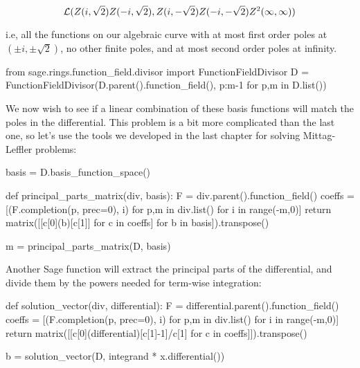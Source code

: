 $${\cal L}(Z(i, \sqrt{2}) Z(-i, \sqrt{2}), Z(i, -\sqrt{2}) Z(-i, -\sqrt{2}) Z^2(\infty,\infty))$$

i.e, all the functions on our algebraic curve with at most first order
poles at $(\pm i,\pm\sqrt{2})$, no other finite poles, and at most
second order poles at infinity.

\begin{sageblock}[riemannroch3]
from sage.rings.function_field.divisor import FunctionFieldDivisor
D = FunctionFieldDivisor(D.parent().function_field(), {p:m-1 for p,m in D.list()})
\end{sageblock}

We now wish to see if a linear combination of these basis functions will
match the poles in the differential.  This problem is a bit more complicated
than the last one, so let's use the tools we developed in the
last chapter for solving Mittag-Leffler problems:

\begin{sageblock}[riemannroch3]
basis = D.basis_function_space()
\end{sageblock}

\begin{sageblock}[riemannroch3]
def principal_parts_matrix(div, basis):
    F = div.parent().function_field()
    coeffs = [(F.completion(p, prec=0), i) for p,m in div.list() for i in range(-m,0)]
    return matrix([[c[0](b)[c[1]] for c in coeffs] for b in basis]).transpose()
\end{sageblock}

\begin{sageblock}[riemannroch3]
m = principal_parts_matrix(D, basis)
\end{sageblock}

Another Sage function will extract the principal parts of the
differential, and divide them by the powers needed for term-wise
integration:

\begin{sageblock}[riemannroch3]
def solution_vector(div, differential):
    F = differential.parent().function_field()
    coeffs = [(F.completion(p, prec=0), i) for p,m in div.list() for i in range(-m,0)]
    return matrix([[c[0](differential)[c[1]-1]/c[1] for c in coeffs]]).transpose()
\end{sageblock}

\begin{sageblock}[riemannroch3]
b = solution_vector(D, integrand * x.differential())
\end{sageblock}

